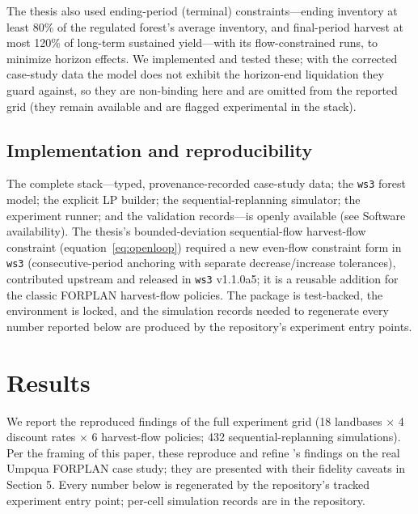\documentclass[12pt]{article}
\begin{document}
The thesis also used ending-period (terminal) constraints---ending inventory at least 80\% of the regulated forest's average inventory, and final-period harvest at most 120\% of long-term sustained yield---with its flow-constrained runs, to minimize horizon effects. We implemented and tested these; with the corrected case-study data the model does not exhibit the horizon-end liquidation they guard against, so they are non-binding here and are omitted from the reported grid (they remain available and are flagged experimental in the stack).

\hypertarget{implementation-and-reproducibility}{%
\subsection{Implementation and reproducibility}\label{implementation-and-reproducibility}}

The complete stack---typed, provenance-recorded case-study data; the \texttt{ws3} forest model; the explicit LP builder; the sequential-replanning simulator; the experiment runner; and the validation records---is openly available (see Software availability). The thesis's bounded-deviation sequential-flow harvest-flow constraint (equation~\eqref{eq:openloop}) required a new even-flow constraint form in \texttt{ws3} (consecutive-period anchoring with separate decrease/increase tolerances), contributed upstream and released in \texttt{ws3} v1.1.0a5; it is a reusable addition for the classic FORPLAN harvest-flow policies. The package is test-backed, the environment is locked, and the simulation records needed to regenerate every number reported below are produced by the repository's experiment entry points.

\section{Results}

We report the reproduced findings of the full experiment grid (18 landbases $\times$ 4 discount rates $\times$ 6 harvest-flow policies; 432 sequential-replanning simulations). Per the framing of this paper, these reproduce and refine \citet{daugherty1991credibility}'s findings on the real Umpqua FORPLAN case study; they are presented with their fidelity caveats in Section 5. Every number below is regenerated by the repository's tracked experiment entry point; per-cell simulation records are in the repository.
\end{document}
